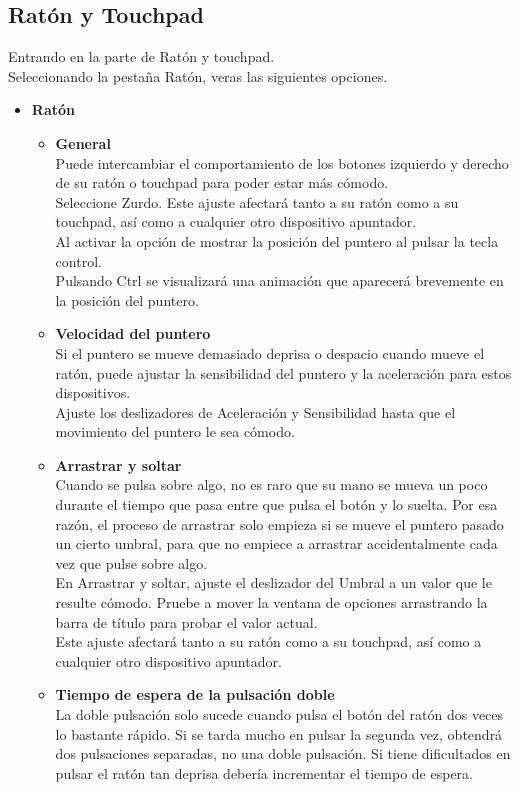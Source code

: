 \documentclass[12pt,letterpaper]{book}
\begin{document}
\subsection{Ratón y Touchpad}
Entrando en la parte de Ratón y touchpad. \\
Seleccionando la pestaña Ratón, veras las siguientes opciones.\\
\begin{itemize}
\item{\large \bf Ratón}\\
\begin{itemize}
\item{\bf General}\\
Puede intercambiar el comportamiento de los botones izquierdo y derecho de su ratón o touchpad para poder estar más cómodo.\\
Seleccione Zurdo.
Este ajuste afectará tanto a su ratón como a su touchpad, así como a cualquier otro dispositivo apuntador.\\

Al activar la opción de mostrar la posición del puntero al pulsar la tecla control.\\
Pulsando Ctrl se visualizará una animación que aparecerá brevemente en la posición del puntero.
\item{\bf Velocidad del puntero}\\
Si el puntero se mueve demasiado deprisa o despacio cuando mueve el ratón, puede ajustar la sensibilidad del puntero y la aceleración para estos dispositivos.\\

Ajuste los deslizadores de Aceleración y Sensibilidad hasta que el movimiento del puntero le sea cómodo.
\item{\bf Arrastrar y soltar}\\
Cuando se pulsa sobre algo, no es raro que su mano se mueva un poco durante el tiempo que pasa entre que pulsa el botón y lo suelta. Por esa razón, el proceso de arrastrar solo empieza si se mueve el puntero pasado un cierto umbral, para que no empiece a arrastrar accidentalmente cada vez que pulse sobre algo.\\

En Arrastrar y soltar, ajuste el deslizador del Umbral a un valor que le resulte cómodo. Pruebe a mover la ventana de opciones arrastrando la barra de título para probar el valor actual.\\

Este ajuste afectará tanto a su ratón como a su touchpad, así como a cualquier otro dispositivo apuntador.
\item{\bf Tiempo de espera de la pulsación doble}\\
La doble pulsación solo sucede cuando pulsa el botón del ratón dos veces lo bastante rápido. Si se tarda mucho en pulsar la segunda vez, obtendrá dos pulsaciones separadas, no una doble pulsación. Si tiene dificultados en pulsar el ratón tan deprisa debería incrementar el tiempo de espera.\\


\end{itemize}
\end{itemize}
\end{document}
